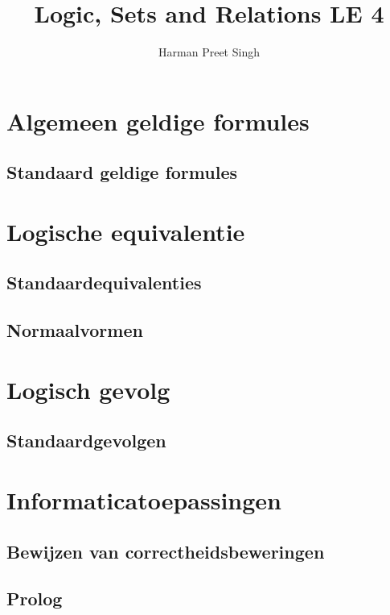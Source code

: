 \documentclass[a4paper, 12pt]{article}
\title{Logic, Sets and Relations \textemdash{} LE 4}
\author{Harman Preet Singh}
\begin{document}

\maketitle
\tableofcontents

\section{Algemeen geldige formules}
\subsection{Standaard geldige formules}

\section{Logische equivalentie}
\subsection{Standaardequivalenties}
\subsection{Normaalvormen}

\section{Logisch gevolg}
\subsection{Standaardgevolgen}

\section{Informaticatoepassingen}
\subsection{Bewijzen van correctheidsbeweringen}
\subsection{Prolog}
\end{document}
